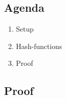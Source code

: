 

\subsection*{Agenda}
\begin{enumerate}
\item Setup
\item Hash-functions
\item Proof
\end{enumerate}

\subsection{Proof}
